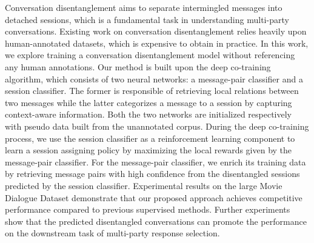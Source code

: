 Conversation disentanglement aims to separate intermingled messages into detached sessions, which is a fundamental task in understanding multi-party conversations. Existing work on conversation disentanglement relies heavily upon human-annotated datasets, which is expensive to obtain in practice. In this work, we explore training a conversation disentanglement model without referencing any human annotations. Our method is built upon the deep co-training algorithm, which consists of two neural networks: a message-pair classifier and a session classifier. The former is responsible of retrieving local relations between two messages while the latter categorizes a message to a session by capturing context-aware information. Both the two networks are initialized respectively with pseudo data built from the unannotated corpus. During the deep co-training process, we use the session classifier as a reinforcement learning component to learn a session assigning policy by maximizing the local rewards given by the message-pair classifier. For the message-pair classifier, we enrich its training data by retrieving message pairs with high confidence from the disentangled sessions predicted by the session classifier. Experimental results on the large Movie Dialogue Dataset demonstrate that our proposed approach achieves competitive performance compared to previous supervised methods. Further experiments show that the predicted disentangled conversations can promote the performance on the downstream task of multi-party response selection.
